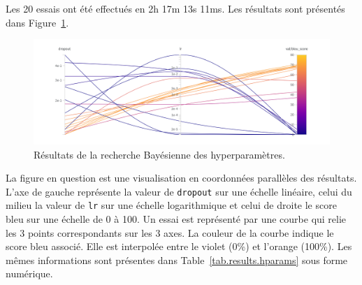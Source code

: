Les 20 essais ont été effectués en 2h 17m 13s 11ms.
Les résultats sont présentés dans Figure~\ref{fig.results.hparams}.
\begin{figure}[hbt]
    \centering
    \includegraphics[width=.8\textwidth]{assets/images/sweep.png}
    \caption{Résultats de la recherche Bayésienne des hyperparamètres.}%
    \label{fig.results.hparams}
\end{figure}
La figure en question est une visualisation en coordonnées parallèles des résultats.
L'axe de gauche représente la valeur de \verb|dropout| sur une échelle linéaire, 
celui du milieu la valeur de \verb|lr| sur une échelle logarithmique 
et celui de droite le score \gls{bleu} sur une échelle de 0 à 100.
Un essai est représenté par une courbe qui relie les 3 points correspondants sur les 3 axes.
La couleur de la courbe indique le score \gls{bleu} associé.
Elle est interpolée entre le violet (0\%) et l'orange (100\%).
Les mêmes informations sont présentes dans Table~\ref{tab.results.hparams} sous forme numérique.

